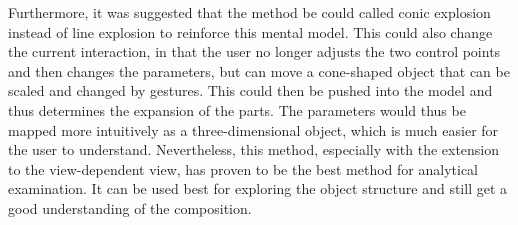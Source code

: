 Furthermore, it was suggested that the method be could called conic explosion instead of line explosion to reinforce this mental model. This could also change the current interaction, in that the user no longer adjusts the two control points and then changes the parameters, but can move a cone-shaped object that can be scaled and changed by gestures. This could then be pushed into the model and thus determines the expansion of the parts. The parameters would thus be mapped more intuitively as a three-dimensional object, which is much easier for the user to understand. Nevertheless, this method, especially with the extension to the view-dependent view, has proven to be the best method for analytical examination. It can be used best for exploring the object structure and still get a good understanding of the composition.

